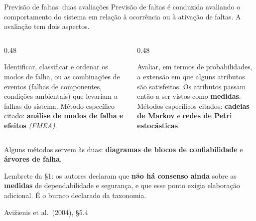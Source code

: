\documentclass{beamer}
\newcommand{\en}[1]{{\color{depCinza}\textit{#1}}}
\newcommand{\sect}[1]{\par\smallskip\hfill{\tiny\color{black!55}Avi\v{z}ienis et al.\ (2004), #1}}
\begin{document}
\begin{frame}{Previs\~ao de faltas: duas avalia\c{c}\~oes}
    \footnotesize
    Previs\~ao de faltas \'e conduzida avaliando o comportamento do sistema em rela\c{c}\~ao \`a ocorr\^encia ou \`a ativa\c{c}\~ao de faltas. A avalia\c{c}\~ao tem dois aspectos.
    \medskip
    \begin{columns}[T]
        \begin{column}{0.48\textwidth}
            \begin{tcolorbox}[colback=depAzul!6,colframe=depAzul!60,boxrule=0.6pt,title={\scriptsize\bfseries Qualitativa (ordinal)}]
                \scriptsize
                Identificar, classificar e ordenar os modos de falha, ou as combina\c{c}\~oes de eventos (falhas de componentes, condi\c{c}\~oes ambientais) que levariam a falhas do sistema.
                \smallskip
                M\'etodo espec\'ifico citado: \textbf{an\'alise de modos de falha e efeitos} \en{(FMEA)}.
            \end{tcolorbox}
        \end{column}
        \begin{column}{0.48\textwidth}
            \begin{tcolorbox}[colback=depVerde!6,colframe=depVerde!60,boxrule=0.6pt,title={\scriptsize\bfseries Quantitativa (probabil\'istica)}]
                \scriptsize
                Avaliar, em termos de probabilidades, a extens\~ao em que alguns atributos s\~ao satisfeitos. Os atributos passam ent\~ao a ser vistos como \textbf{medidas}.
                \smallskip
                M\'etodos espec\'ificos citados: \textbf{cadeias de Markov} e \textbf{redes de Petri estoc\'asticas}.
            \end{tcolorbox}
        \end{column}
    \end{columns}
    \medskip
    \begin{ancora}
        \footnotesize
        Alguns m\'etodos servem \`as duas: \textbf{diagramas de blocos de confiabilidade} e \textbf{\'arvores de falha}.
    \end{ancora}
    \medskip
    {\scriptsize Lembrete da \S1: os autores declaram que \textbf{n\~ao h\'a consenso ainda} sobre as \textbf{medidas} de dependabilidade e seguran\c{c}a, e que esse ponto exigia elabora\c{c}\~ao adicional. \'E o buraco declarado da taxonomia.}
    \sect{\S5.4}
\end{frame}
\end{document}

